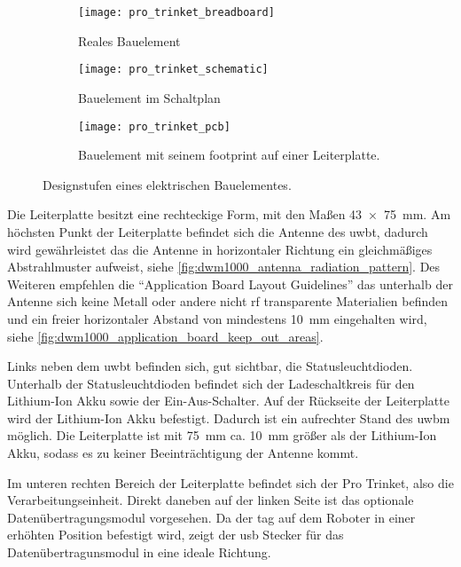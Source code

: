 \begin{figure}
	\begin{subfigure}[t]{0.3\textwidth}
		\centering
		\texttt{[image: pro\_trinket\_breadboard]}
		\caption{Reales Bauelement}
		\label{fig:pro_trinket_breadboard}
	\end{subfigure}
	\quad
	\begin{subfigure}[t]{0.3\textwidth}
		\centering
		\texttt{[image: pro\_trinket\_schematic]}
		\caption{Bauelement im Schaltplan}
		\label{fig:pro_trinket_schematic}
	\end{subfigure}
	\quad
	\begin{subfigure}[t]{0.3\textwidth}
		\centering
		\texttt{[image: pro\_trinket\_pcb]}
		\caption{Bauelement mit seinem \Gls{footprint} auf einer Leiterplatte.}
		\label{fig:pro_trinket_pcb}
	\end{subfigure}
	\caption{Designstufen eines elektrischen Bauelementes.}
	\label{fig:breadboard_schematic_pcb}
\end{figure}

Die Leiterplatte besitzt eine rechteckige Form, mit den Maßen \SI{43 x 75}{\mm}. Am höchsten Punkt der Leiterplatte befindet sich die Antenne des \Gls{uwbt}, dadurch wird gewährleistet das die Antenne in horizontaler Richtung ein gleichmäßiges Abstrahlmuster aufweist, siehe \autoref{fig:dwm1000_antenna_radiation_pattern}. Des Weiteren empfehlen die \enquote{Application Board Layout Guidelines} das unterhalb der Antenne sich keine Metall oder andere nicht \gls{rf} transparente Materialien befinden und ein freier horizontaler Abstand von mindestens \SI{10}{\mm} eingehalten wird, siehe \autoref{fig:dwm1000_application_board_keep_out_areas}. \cite{decawave2016dwm1kdatasheet}

Links neben dem \Gls{uwbt} befinden sich, gut sichtbar, die Statusleuchtdioden. Unterhalb der Statusleuchtdioden befindet sich der Ladeschaltkreis für den Lithium-Ion Akku sowie der Ein-Aus-Schalter. Auf der Rückseite der Leiterplatte wird der Lithium-Ion Akku befestigt. Dadurch ist ein aufrechter Stand des \Gls{uwbm} möglich. Die Leiterplatte ist mit \SI{75}{\mm} ca. \SI{10}{\mm} größer als der Lithium-Ion Akku, sodass es zu keiner Beeinträchtigung der Antenne kommt.

Im unteren rechten Bereich der Leiterplatte befindet sich der Pro Trinket, also die Verarbeitungseinheit. Direkt daneben auf der linken Seite ist das optionale Datenübertragungsmodul vorgesehen. Da der \Gls{tag} auf dem Roboter in einer erhöhten Position befestigt wird, zeigt der \Gls{usb} Stecker für das Datenübertragunsmodul in eine ideale Richtung.

